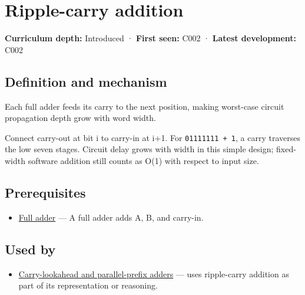\hypertarget{appendix-17917d9fdbe3}{}\label{referencestart:appendix-17917d9fdbe3}
\section{Ripple-carry addition}\label{appendix-17917d9fdbe3-ripple-carry-addition}

\textbf{Curriculum depth:} Introduced · \textbf{First seen:} C002 · \textbf{Latest development:} C002

\begin{allmightroledefinition}

\subsection{Definition and mechanism}\label{appendix-17917d9fdbe3-definition-and-mechanism}

Each full adder feeds its carry to the next position, making worst-case circuit propagation depth grow with word width.

\end{allmightroledefinition}

Connect carry-out at bit i to carry-in at i+1. For \texttt{01111111\ +\ 1}, a carry traverses the low seven stages. Circuit delay grows with width in this simple design; fixed-width software addition still counts as O(1) with respect to input size.

\subsection{Prerequisites}\label{appendix-17917d9fdbe3-prerequisites}

\begin{itemize}
\tightlist
\item
  \hyperref[appendix-d1a5b1e520c2]{Full adder} --- A full adder adds A, B, and carry-in.
\end{itemize}

\subsection{Used by}\label{appendix-17917d9fdbe3-used-by}

\begin{itemize}
\tightlist
\item
  \hyperref[appendix-b5c46b2d94ff]{Carry-lookahead and parallel-prefix adders} --- uses ripple-carry addition as part of its representation or reasoning.
\end{itemize}

